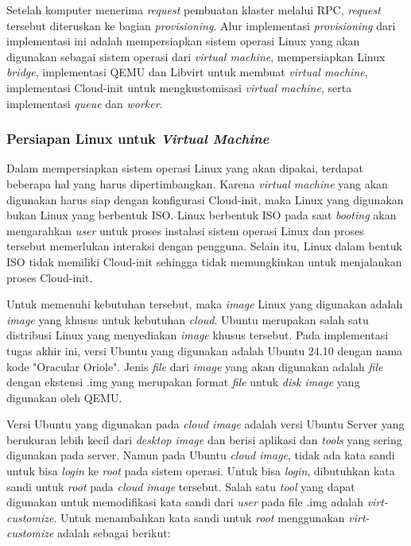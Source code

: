 Setelah komputer menerima \emph{request} pembuatan klaster melalui RPC,
\emph{request} tersebut diteruskan ke bagian \emph{provisioning}. Alur 
implementasi \emph{provisioning} dari implementasi ini adalah mempersiapkan
sistem operasi Linux yang akan digunakan sebagai sistem operasi dari
\emph{virtual machine}, mempersiapkan Linux \emph{bridge},
implementasi QEMU dan Libvirt untuk membuat \emph{virtual machine},
implementasi Cloud-init untuk mengkustomisasi \emph{virtual machine}, 
serta implementasi \emph{queue} dan \emph{worker}.

\subsubsection{Persiapan Linux untuk \emph{Virtual Machine}}
\label{sec:persiapan-linux-untuk-virtual-machine}

Dalam mempersiapkan sistem operasi Linux yang akan dipakai, terdapat beberapa
hal yang harus dipertimbangkan. Karena \emph{virtual machine} yang akan digunakan
harus siap dengan konfigurasi Cloud-init, maka Linux yang digunakan bukan Linux
yang berbentuk ISO. Linux berbentuk ISO pada saat \emph{booting} akan mengarahkan
\emph{user} untuk proses instalasi sistem operasi Linux dan proses tersebut memerlukan
interaksi dengan pengguna. Selain itu, Linux dalam bentuk ISO tidak memiliki Cloud-init
sehingga tidak memungkinkan untuk menjalankan proses Cloud-init.

Untuk memenuhi kebutuhan tersebut, maka \emph{image} Linux yang digunakan
adalah \emph{image} yang khusus untuk kebutuhan \emph{cloud}. Ubuntu merupakan
salah satu distribusi Linux yang menyediakan \emph{image} khusus tersebut.
Pada implementasi tugas akhir ini, versi Ubuntu yang digunakan adalah Ubuntu 24.10
dengan nama kode "Oracular Oriole". Jenis \emph{file} dari \emph{image} yang akan digunakan
adalah \emph{file} dengan ekstensi .img yang merupakan format \emph{file} untuk \emph{disk image}
yang digunakan oleh QEMU.

Versi Ubuntu yang digunakan pada \emph{cloud image} adalah versi Ubuntu Server yang
berukuran lebih kecil dari \emph{desktop image} dan berisi aplikasi dan \emph{tools}
yang sering digunakan pada server. Namun pada Ubuntu \emph{cloud image}, tidak ada
kata sandi untuk bisa \emph{login} ke \emph{root} pada sistem operasi. Untuk bisa \emph{login},
dibutuhkan kata sandi untuk \emph{root} pada \emph{cloud image} tersebut. Salah satu \emph{tool} yang
dapat digunakan untuk memodifikasi kata sandi dari \emph{user} pada file .img adalah \emph{virt-customize}.
Untuk menambahkan kata sandi untuk \emph{root} menggunakan \emph{virt-customize} adalah
sebagai berikut:

